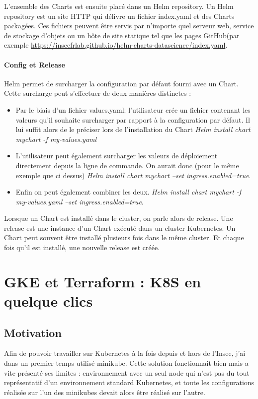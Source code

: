 \documentclass[11pt,fleqn]{book} %
\begin{document}
L'ensemble des Charts est ensuite placé dans un Helm repository. Un Helm repository est un site HTTP qui délivre un fichier index.yaml et des Charts packagées. Ces fichiers peuvent être servis par n'importe quel serveur web, service de stockage d'objets ou un hôte de site statique tel que les pages GitHub(par exemple \url{https://inseefrlab.github.io/helm-charts-datascience/index.yaml}.

\subsubsection{Config et Release}
Helm permet de surcharger la configuration par défaut fourni avec un Chart. Cette surcharge peut s'effectuer de deux manières distinctes :
\begin{itemize}
    \item Par le biais d'un fichier values.yaml: l'utilisateur crée un fichier contenant les valeurs qu'il souhaite surcharger par rapport à la configuration par défaut.
    Il lui suffit alors de le préciser lors de l'installation du Chart \textit{Helm install chart mychart -f my-values.yaml}
    \item L'utilisateur peut également surcharger les valeurs de déploiement directement depuis la ligne de commande. On aurait donc (pour le même exemple que ci dessus) \textit{Helm install chart mychart --set ingress.enabled=true}.
    \item Enfin on peut également combiner les deux. \textit{Helm install chart mychart -f my-values.yaml --set ingress.enabled=true}.\\
\end{itemize}

Lorsque un Chart est installé dans le cluster, on parle alors de release. Une release est une instance d'un Chart exécuté dans un cluster Kubernetes. Un Chart peut souvent être installé plusieurs fois dans le même cluster. Et chaque fois qu'il est installé, une nouvelle release est créée.


\chapter{GKE et Terraform : K8S en quelque clics}
\label{Terraform}
\vspace{-2cm}
\section*{Motivation}
Afin de pouvoir travailler sur Kubernetes à la fois depuis et hors de l'Insee, j'ai dans un premier temps utilisé minikube. Cette solution fonctionnait bien mais a vite présenté ses limites : environnement avec un seul node qui n'est pas du tout représentatif d'un environnement standard Kubernetes, et toute les configurations réalisée sur l'un des minikubes devait alors être réalisé sur l'autre.\newline
\end{document}
